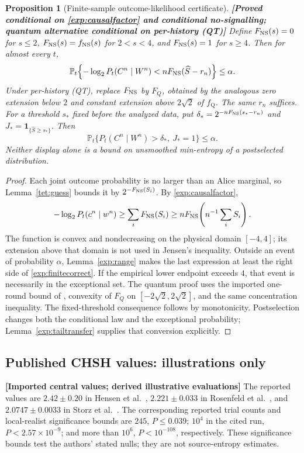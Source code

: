 \documentclass[11pt,a4paper]{article}
\newtheorem{proposition}[theorem]{Proposition}
\theoremstyle{definition}
\theoremstyle{remark}\newtheorem{remark}[theorem]{Remark}
\newcommand{\status}[1]{\textbf{[#1]}\quad}
\newcommand{\Prb}{\mathbb P}
\newcommand{\one}{\mathbf1}
\newcommand{\fNS}{f_{\mathrm{NS}}}
\newcommand{\fQ}{f_{\mathrm{Q}}}
\begin{document}
\begin{proposition}[Finite-sample outcome-likelihood certificate]\label{exp:finite}
\status{Proved conditional on \eqref{exp:causalfactor} and conditional no-signalling; quantum alternative conditional on per-history (QT)}
Define $F_{\rm NS}(s)=0$ for $s\le2$, $F_{\rm NS}(s)=\fNS(s)$ for $2<s<4$, and $F_{\rm NS}(s)=1$ for $s\ge4$. Then for almost every $t$,
\begin{equation}\label{exp:finitecorrect}
 \Prb_t\!\left\{-\log_2 P_t(C^n\mid W^n)
       <nF_{\rm NS}(\widehat S-r_n)\right\}\le\alpha.
\end{equation}
Under per-history (QT), replace $F_{\rm NS}$ by $F_Q$, obtained by the analogous zero extension below $2$ and constant extension above $2\sqrt2$ of $\fQ$. The same $r_n$ suffices.
For a threshold $s_*$ fixed before the analyzed data, put
$\delta_*=2^{-nF_{\rm NS}(s_*-r_n)}$ and
$J_* =\one_{\{\widehat S\ge s_*\}}$. Then
\begin{equation}\label{exp:finitetail}
 \Prb_t\{P_t(C^n\mid W^n)>\delta_*,\ J_*=1\}\le\alpha.
\end{equation}
Neither display alone is a bound on unsmoothed min-entropy of a postselected distribution.
\end{proposition}
\begin{proof}
Each joint outcome probability is no larger than an Alice marginal, so Lemma~\ref{tet:guess} bounds it by
$2^{-F_{\rm NS}(S_i)}$. By \eqref{exp:causalfactor},
\[
 -\log_2P_t(c^n\mid w^n)
 \ge\sum_iF_{\rm NS}(S_i)
 \ge nF_{\rm NS}\!\left(n^{-1}\sum_i S_i\right).
\]
The function is convex and nondecreasing on the physical domain $[-4,4]$; its extension above that domain is not used in Jensen's inequality. Outside an event of probability $\alpha$, Lemma~\ref{exp:range} makes the last expression at least the right side of \eqref{exp:finitecorrect}. If the empirical lower endpoint exceeds $4$, that event is necessarily in the exceptional set. The quantum proof uses the imported one-round bound of \cite{Pironio10}, convexity of $F_Q$ on $[-2\sqrt2,2\sqrt2]$, and the same concentration inequality. The fixed-threshold consequence follows by monotonicity. Postselection changes both the conditional law and the exceptional probability; Lemma~\ref{exp:tailtransfer} supplies that conversion explicitly.
\end{proof}

\subsection{Published CHSH values: illustrations only}
\status{Imported central values; derived illustrative evaluations}
The reported values are $2.42\pm0.20$ in Hensen et al.\ \cite{Hensen15}, $2.221\pm0.033$ in Rosenfeld et al.\ \cite{Rosenfeld17}, and $2.0747\pm0.0033$ in Storz et al.\ \cite{Storz23}. The corresponding reported trial counts and local-realist significance bounds are $245$, $P\le0.039$; $10^4$ in the cited run, $P<2.57\times10^{-9}$; and more than $10^6$, $P<10^{-108}$, respectively. These significance bounds test the authors' stated nulls; they are not source-entropy estimates.
\end{document}

